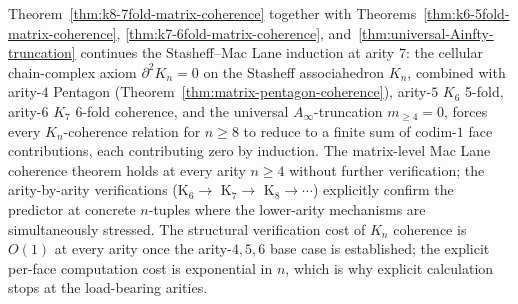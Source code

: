 \begin{remark}
\label{rem:k8-coherence-implies-higher}
Theorem~\ref{thm:k8-7fold-matrix-coherence} together with
Theorems~\ref{thm:k6-5fold-matrix-coherence},
\ref{thm:k7-6fold-matrix-coherence}, and~\ref{thm:universal-Ainfty-truncation}
continues the Stasheff--Mac Lane induction at arity $7$: the cellular
chain-complex axiom $\partial^2 K_n = 0$ on the Stasheff associahedron
$K_n$, combined with arity-$4$ Pentagon
\textup{(}Theorem~\ref{thm:matrix-pentagon-coherence}\textup{),} arity-$5$
$K_6$ 5-fold, arity-$6$ $K_7$ 6-fold coherence, and the universal
$A_\infty$-truncation $m_{\geq 4} = 0$, forces every $K_n$-coherence
relation for $n \geq 8$ to reduce to a finite sum of codim-$1$ face
contributions, each contributing zero by induction. The matrix-level
Mac Lane coherence theorem holds at every arity $n \geq 4$ without
further verification; the arity-by-arity verifications
\textup{(}K$_6 \to$ K$_7 \to$ K$_8 \to \cdots$\textup{)}
explicitly confirm the predictor at concrete $n$-tuples where the
lower-arity mechanisms are simultaneously stressed. The structural
verification cost of $K_n$ coherence is $O(1)$ at every arity once the
arity-$4, 5, 6$ base case is established; the explicit per-face
computation cost is exponential in $n$, which is why explicit
calculation stops at the load-bearing arities.
\end{remark}

